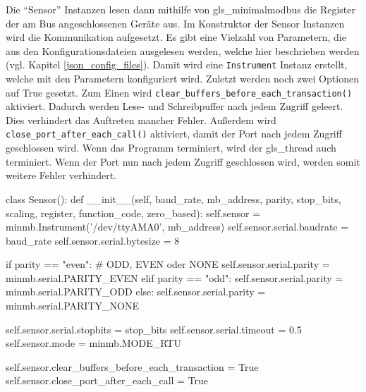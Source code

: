 Die \enquote{Sensor} Instanzen lesen dann mithilfe von \gls{gls_minimalmodbus} die Register der am Bus angeschlossenen Geräte aus. Im Konstruktor der Sensor Instanzen wird die Kommunikation aufgesetzt. Es gibt eine Vielzahl von Parametern, die aus den Konfigurationsdateien ausgelesen werden, welche hier beschrieben werden (vgl. Kapitel \ref{json_config_files}). Damit wird eine \lstinline{Instrument} Instanz erstellt, welche mit den Parametern konfiguriert wird. Zuletzt werden noch zwei Optionen auf True gesetzt. Zum Einen wird \lstinline{clear_buffers_before_each_transaction()} aktiviert. Dadurch werden Lese- und Schreibpuffer nach jedem Zugriff geleert. Dies verhindert das Auftreten mancher Fehler. Außerdem wird \lstinline{close_port_after_each_call()} aktiviert, damit der Port nach jedem Zugriff geschlossen wird. Wenn das Programm terminiert, wird der \gls{gls_thread} auch terminiert. Wenn der Port nun nach jedem Zugriff geschlossen wird, werden somit weitere Fehler verhindert.

\begin{pythoncode}
class Sensor():
	def __init__(self, baud_rate, mb_address, parity, stop_bits, scaling, register, function_code, zero_based):
		self.sensor = minmb.Instrument('/dev/ttyAMA0', mb_address)
		self.sensor.serial.baudrate = baud_rate
		self.sensor.serial.bytesize = 8
		
		if parity == "even":  # ODD, EVEN oder NONE
			self.sensor.serial.parity = minmb.serial.PARITY_EVEN
		elif parity == "odd":
			self.sensor.serial.parity = minmb.serial.PARITY_ODD
		else:
			self.sensor.serial.parity = minmb.serial.PARITY_NONE
		
		self.sensor.serial.stopbits = stop_bits
		self.sensor.serial.timeout = 0.5
		self.sensor.mode = minmb.MODE_RTU
		
		self.sensor.clear_buffers_before_each_transaction = True
		self.sensor.close_port_after_each_call = True
\end{pythoncode}


